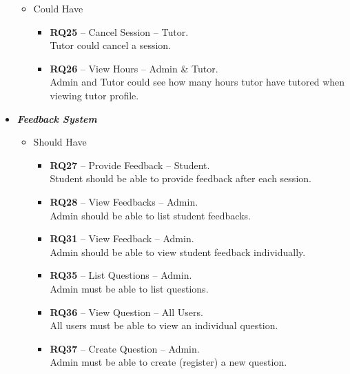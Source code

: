 \begin{justify}
\begin{itemize}
\begin{itemize}
                \item Could Have
                    \begin{itemize}
                        \item \textbf{\textcolor{vin}{RQ25}} -- Cancel Session -- Tutor.\\Tutor could cancel a session.

                        \item \textbf{\textcolor{vin}{RQ26}} -- View Hours -- Admin \& Tutor.\\Admin and Tutor could see how many hours tutor have tutored when viewing tutor profile.
                    \end{itemize}
            \end{itemize}
        \item \textbf{\textit{Feedback System}}
            \begin{itemize}
                \item Should Have
                    \begin{itemize}
                        \item \textbf{\textcolor{vin}{RQ27}} -- Provide Feedback -- Student.\\Student should be able to provide feedback after each session.

                        \item \textbf{\textcolor{vin}{RQ28}} -- View Feedbacks -- Admin.\\Admin should be able to list student feedbacks.

                        \item \textbf{\textcolor{vin}{RQ31}} -- View Feedback -- Admin.\\Admin should be able to view student feedback individually.

                        \item \textbf{\textcolor{vin}{RQ35}} -- List Questions -- Admin.\\Admin must be able to list questions.
                        
                        \item \textbf{\textcolor{vin}{RQ36}} -- View Question -- All Users.\\All users must be able to view an individual question.

                        \item \textbf{\textcolor{vin}{RQ37}} -- Create Question -- Admin.\\Admin must be able to create (register) a new question.


\end{itemize}
\end{itemize}
\end{itemize}
\end{justify}
